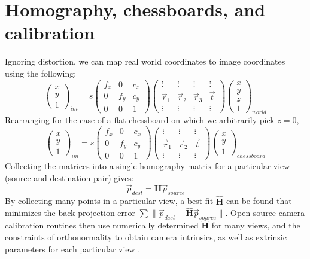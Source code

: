 \section{Homography, chessboards, and calibration}
Ignoring distortion, we can map real world coordinates to image coordinates using the following:
\begin{equation}
\begin{pmatrix}
x \\ y \\ 1
\end{pmatrix}_{im}
=
s
\begin{pmatrix}
f_x & 0 & c_x \\
0 & f_y & c_y \\
0 & 0 & 1
\end{pmatrix}
\begin{pmatrix}
\vdots & \vdots & \vdots & \vdots \\
\vec{r}_1    & \vec{r}_2    & \vec{r}_3    & \vec{t} \\
\vdots & \vdots & \vdots & \vdots
\end{pmatrix}
\begin{pmatrix}
x \\ y \\ z \\ 1
\end{pmatrix}_{world}
\end{equation}
Rearranging for the case of a flat chessboard on which we arbitrarily pick $z=0$,
\begin{equation}
\begin{pmatrix}
x \\ y \\ 1
\end{pmatrix}_{im}
=
s
\begin{pmatrix}
f_x & 0 & c_x \\
0 & f_y & c_y \\
0 & 0 & 1
\end{pmatrix}
\begin{pmatrix}
\vdots & \vdots & \vdots \\
\vec{r}_1 & \vec{r}_2 & \vec{t} \\
\vdots & \vdots & \vdots
\end{pmatrix}
\begin{pmatrix}
x \\ y \\ 1
\end{pmatrix}_{chessboard}
\end{equation}
Collecting the matrices into a single homography matrix for a particular view (source and destination pair) gives:
\begin{equation}
\vec{p}_{dest} = \mathbf{H} \vec{p}_{source}
\end{equation}
By collecting many points in a particular view, a best-fit $\mathbf{\hat{H}}$ can be found that minimizes the back projection error $\sum \|\vec{p}_{dest}-\mathbf{\hat{H}}\vec{p}_{source} \|$. Open source camera calibration routines then use numerically determined $\mathbf{\hat{H}}$ for many views, and the constraints of orthonormality to obtain camera intrinsics, as well as extrinsic parameters for each particular view \cite{Bradski:2008}.  

